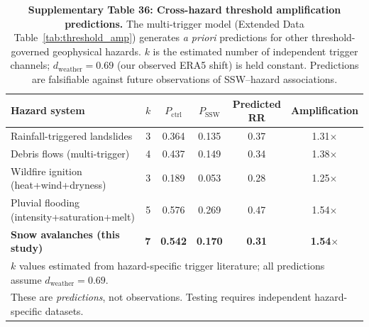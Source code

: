 \documentclass[11pt,letterpaper]{article}
\begin{document}
\begin{table}[h!]
\centering
\caption{\textbf{Supplementary Table 36: Cross-hazard threshold amplification predictions.} The multi-trigger model (Extended Data Table~\ref{tab:threshold_amp}) generates \emph{a priori} predictions for other threshold-governed geophysical hazards. $k$ is the estimated number of independent trigger channels; $d_{\mathrm{weather}} = 0.69$ (our observed ERA5 shift) is held constant. Predictions are falsifiable against future observations of SSW--hazard associations.}
\label{tab:cross_hazard}
\begin{tabular}{lrcccc}
\toprule
Hazard system & $k$ & $P_{\mathrm{ctrl}}$ & $P_{\mathrm{SSW}}$ & Predicted RR & Amplification \\
\midrule
Rainfall-triggered landslides & 3 & 0.364 & 0.135 & 0.37 & 1.31$\times$ \\
Debris flows (multi-trigger) & 4 & 0.437 & 0.149 & 0.34 & 1.38$\times$ \\
Wildfire ignition (heat+wind+dryness) & 3 & 0.189 & 0.053 & 0.28 & 1.25$\times$ \\
Pluvial flooding (intensity+saturation+melt) & 5 & 0.576 & 0.269 & 0.47 & 1.54$\times$ \\
\textbf{Snow avalanches (this study)} & \textbf{7} & \textbf{0.542} & \textbf{0.170} & \textbf{0.31} & \textbf{1.54$\times$} \\
\bottomrule
\multicolumn{6}{l}{\footnotesize $k$ values estimated from hazard-specific trigger literature; all predictions assume $d_{\mathrm{weather}} = 0.69$.} \\
\multicolumn{6}{l}{\footnotesize These are \emph{predictions}, not observations. Testing requires independent hazard-specific datasets.} \\
\end{tabular}
\end{table}
\end{document}
